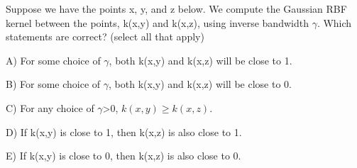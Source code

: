 Suppose we have the points x, y, and z below. We compute the Gaussian RBF kernel between the points, k(x,y) and k(x,z), using inverse bandwidth \ensuremath{\gamma}. Which statements are correct? (select all that apply)


A) For some choice of \ensuremath{\gamma}, both k(x,y) and k(x,z) will be close to 1.


B) For some choice of \ensuremath{\gamma}, both k(x,y) and k(x,z) will be close to 0.


C) For any choice of \ensuremath{\gamma}>0, \(k(x,y)\ge k(x,z)\).


D) If k(x,y) is close to 1, then k(x,z) is also close to 1.


E) If k(x,y) is close to 0, then k(x,z) is also close to 0.


